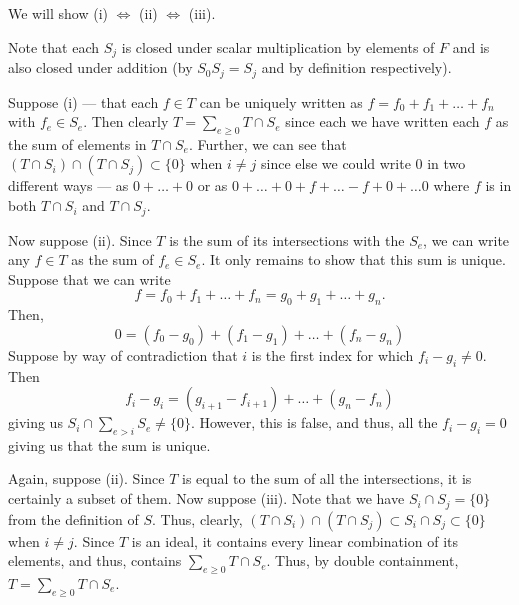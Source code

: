 \documentclass[12 pt, letterpaper]{hmcpset}
\begin{document}
\begin{solution}
	We will show (i) $\iff$ (ii) $\iff$ (iii).

	Note that each $S_{j}$ is closed under scalar multiplication by elements of $F$ and is also closed under addition (by $S_{0} S_{j} = S_{j}$ and by definition respectively).

	Suppose (i) --- that each  $f \in T$ can be uniquely written as $f = f_{0} + f_{1} + \dots + f_{n}$ with $f_{e} \in S_{e}$. Then clearly $T = \sum_{e \ge 0} T \cap S_{e}$ since each we have written each $f$ as the sum of elements in $T \cap S_{e}$. Further, we can see that $(T \cap S_{i}) \cap (T \cap S_{j}) \subset \{ 0 \}$ when $i \neq j$ since else we could write $0$ in two different ways --- as $0 + \dots + 0$ or as $0 + \dots + 0 + f + \dots - f + 0 + \dots 0$ where $f$ is in both $T \cap S_{i}$ and $T \cap S_{j}$.

	Now suppose (ii). Since $T$ is the sum of its intersections with the $S_{e}$, we can write any $f \in T$ as the sum of $f_{e} \in S_{e}$. It only remains to show that this sum is unique. Suppose that we can write
	\[
		f = f_{0} + f_{1} + \dots + f_{n} = g_{0} + g_{1} + \dots + g_{n}.
	\]
	Then,
	\[
		0 = (f_{0} - g_{0}) + (f_{1} - g_{1}) + \dots + (f_{n} - g_{n})
	\]
	Suppose by way of contradiction that $i$ is the first index for which $f_{i} - g_{i} \neq 0$. Then
	\[
		f_{i} - g_{i} = (g_{i + 1} - f_{i + 1}) + \dots + (g_{n} - f_{n})
	\]
	giving us $S_{i} \cap \sum_{e > i} S_{e} \neq \{ 0 \}$. However, this is false, and thus, all the $f_{i} - g_{i} = 0$ giving us that the sum is unique.

	Again, suppose (ii). Since $T$ is equal to the sum of all the intersections, it is certainly a subset of them. Now suppose (iii). Note that we have $S_{i} \cap S_{j} = \{ 0 \}$ from the definition of $S$. Thus, clearly, $(T \cap S_{i}) \cap (T \cap S_{j}) \subset S_{i} \cap S_{j} \subset \{ 0 \}$ when $i \neq j$. Since $T$ is an ideal, it contains every linear combination of its elements, and thus, contains $\sum_{e \ge 0} T \cap S_{e}$. Thus, by double containment, $T = \sum_{e \ge 0} T \cap S_{e}$.
\end{solution}

\pagebreak
\end{document}
